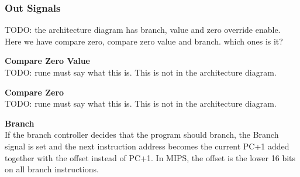 \subsubsection{Out Signals}
TODO: the architecture diagram has branch, value and zero override enable. Here we have compare zero, compare zero value and branch. which ones is it?

\begin{description}
\item{\textbf{Compare Zero Value}} \\

TODO: rune must say what this is.
This is not in the architecture diagram.

\item{\textbf{Compare Zero}} \\

TODO: rune must say what this is.
This is not in the architecture diagram.

\item{\textbf{Branch}} \\

If the branch controller decides that the program should branch, the Branch signal is set and the next instruction address becomes the current PC+1 added together with the offset instead of PC+1.
In MIPS, the offset is the lower 16 bits on all branch instructions.

\end{description}
